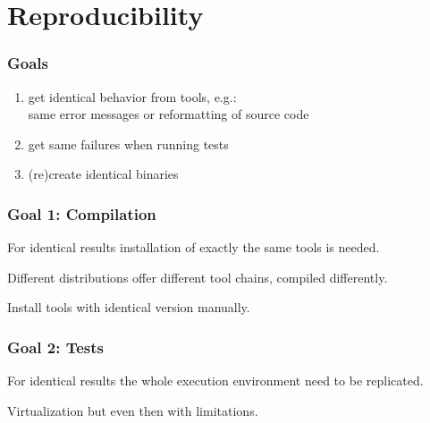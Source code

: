 \section{Reproducibility}

\begin{frame}
	\frametitle{Goals}

	\begin{enumerate}[<+-| alert@+>]

	\item get identical behavior from tools, e.g.: \\ same error messages or reformatting of source code
	\item get same failures when running tests
	\item (re)create identical binaries
	\end{enumerate}
\end{frame}

\begin{frame}
	\frametitle{Goal 1: Compilation}

	For identical results installation of exactly the same tools is needed.

	\pause

	\begin{problem}
	Different distributions offer different tool chains, compiled differently.
	\end{problem}

	\vspace{1cm}
	\pause

	\begin{solution}
	Install tools with identical version manually.
	\end{solution}
\end{frame}

\begin{frame}
	\frametitle{Goal 2: Tests}

	\begin{problem}
	For identical results the whole execution environment need to be replicated.
	\end{problem}

	\vspace{1cm}
	\pause

	\begin{solution}
	Virtualization but even then with limitations.
	\end{solution}
\end{frame}


